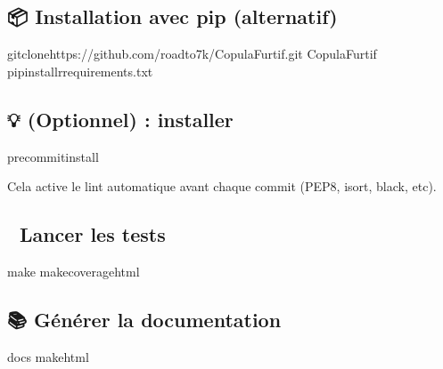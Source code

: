 \documentclass[letterpaper,18pt,english]{sphinxhowto}
\begin{document}
\subsection{📦 Installation avec pip (alternatif)}
\label{\detokenize{pages/installation:installation-avec-pip-alternatif}}
\begin{sphinxVerbatim}[commandchars=\\\{\}]
gitclonehttps://github.com/roadto7k/CopulaFurtif.git
CopulaFurtif
pipinstall\PYGZhy{}rrequirements.txt
\end{sphinxVerbatim}


\subsection{💡 (Optionnel) : installer }
\label{\detokenize{pages/installation:optionnel-installer-pre-commit}}
\begin{sphinxVerbatim}[commandchars=\\\{\}]
pre\PYGZhy{}commitinstall
\end{sphinxVerbatim}

\sphinxAtStartPar
Cela active le lint automatique avant chaque commit (PEP8, isort, black, etc).


\subsection{🧪 Lancer les tests}
\label{\detokenize{pages/installation:lancer-les-tests}}
\begin{sphinxVerbatim}[commandchars=\\\{\}]
make
makecoverage\PYGZhy{}html
\end{sphinxVerbatim}


\subsection{📚 Générer la documentation}
\label{\detokenize{pages/installation:generer-la-documentation}}
\begin{sphinxVerbatim}[commandchars=\\\{\}]
docs
makehtml
\end{sphinxVerbatim}
\end{document}
